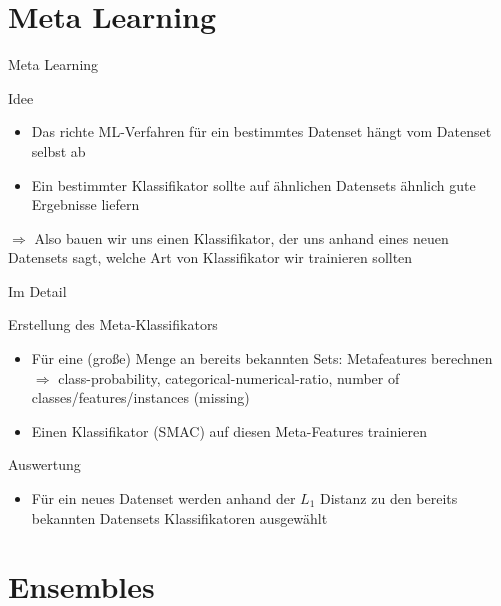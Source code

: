 \documentclass{beamer}
\begin{document}
	\section{Meta Learning}%
	
	\begin{frame}{Meta Learning}
		\begin{alertblock}{Idee}
			\begin{itemize}
				\item Das richte ML-Verfahren für ein bestimmtes Datenset hängt vom Datenset selbst ab
				\item Ein bestimmter Klassifikator sollte auf ähnlichen Datensets ähnlich gute Ergebnisse liefern
				\pause
			\end{itemize}
			$\Rightarrow$ Also bauen wir uns einen Klassifikator, der uns anhand eines neuen Datensets sagt, welche Art von Klassifikator wir trainieren sollten
		\end{alertblock}
	\end{frame}
	
	\begin{frame}{Im Detail}
		\begin{alertblock}{Erstellung des Meta-Klassifikators}
			\begin{itemize}
				\item Für eine (große) Menge an bereits bekannten Sets: Metafeatures berechnen \\ $\Rightarrow$ class-probability, categorical-numerical-ratio, number of classes/features/instances (missing)
				\item Einen Klassifikator (SMAC) auf diesen Meta-Features trainieren
			\end{itemize}
		\end{alertblock}
		\pause
		\begin{alertblock}{Auswertung}
			\begin{itemize}
				\item Für ein neues Datenset werden anhand der $L_1$ Distanz zu den bereits bekannten Datensets Klassifikatoren ausgewählt
			\end{itemize}
		\end{alertblock}
	\end{frame}
	
	
	\section{Ensembles}%
	
\end{document}
